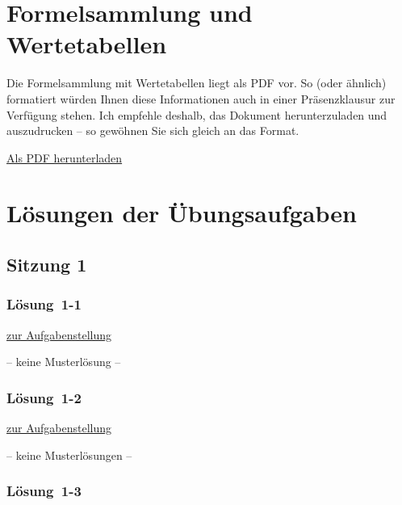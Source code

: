\documentclass[
  11pt,
  ngerman,
  a4paper,
]{report}
\begin{document}
\hypertarget{formeln}{%
\chapter*{Formelsammlung und Wertetabellen}\label{formeln}}

Die Formelsammlung mit Wertetabellen liegt als PDF vor. So (oder ähnlich) formatiert würden Ihnen diese Informationen auch in einer Präsenzklausur zur Verfügung stehen. Ich empfehle deshalb, das Dokument herunterzuladen und auszudrucken -- so gewöhnen Sie sich gleich an das Format.

\href{Formelsammlung\%20und\%20Wertetabellen.pdf}{Als PDF herunterladen}

\hypertarget{luxf6sungen-der-uxfcbungsaufgaben}{%
\chapter*{Lösungen der Übungsaufgaben}\label{luxf6sungen-der-uxfcbungsaufgaben}}

\hypertarget{sitzung-1}{%
\section*{Sitzung 1}\label{sitzung-1}}

\hypertarget{loesung-1-1}{%
\subsection{Lösung~1-1}\label{loesung-1-1}}

\protect\hyperlink{aufgabe-1-1}{zur Aufgabenstellung}

-- keine Musterlösung --

\hypertarget{loesung-1-2}{%
\subsection{Lösung~1-2}\label{loesung-1-2}}

\protect\hyperlink{aufgabe-1-2}{zur Aufgabenstellung}

-- keine Musterlösungen --

\hypertarget{loesung-1-3}{%
\subsection{Lösung~1-3}\label{loesung-1-3}}
\end{document}

